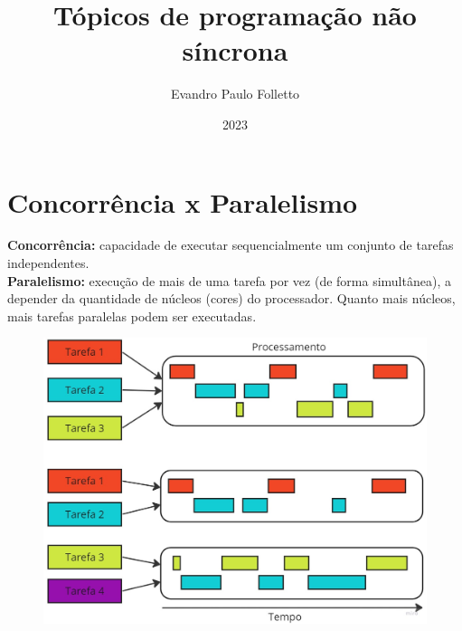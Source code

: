 \documentclass{beamer}
\title{Tópicos de programação não síncrona}
\author{Evandro Paulo Folletto}
\institute[Volpi]{Volpi.tech}
\date{2023}
\begin{document}
	\begin{frame}
	 \titlepage
	\end{frame}

	\tableofcontents
	\newpage

	\section{Concorrência x Paralelismo}
 	\textbf{Concorrência:} capacidade de executar sequencialmente um conjunto de tarefas independentes. \\
	\textbf{Paralelismo:} execução de mais de uma tarefa por vez (de forma simultânea), a depender da quantidade de núcleos (cores) do processador. Quanto mais núcleos, mais tarefas paralelas podem ser executadas.
	\begin{figure}
 	 \centering
 	 \includegraphics[scale=0.2]{figuras/concorrencia_paralelismo.jpg}
	\end{figure}
	\newpage
\end{document}
